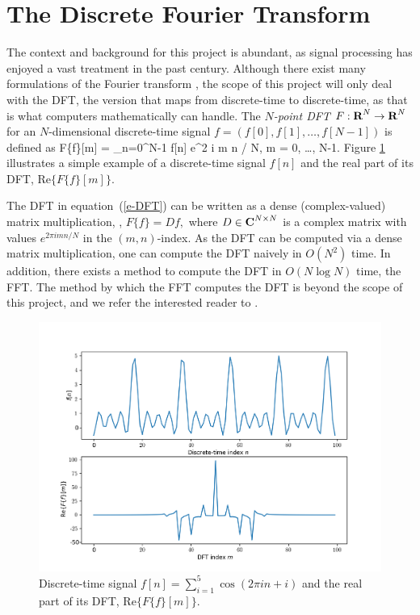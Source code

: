 \documentclass[12pt]{article}
\begin{document}
\section{The Discrete Fourier Transform}
The context and background for this project is abundant, as signal processing has enjoyed a vast treatment
in the past century. Although there exist many formulations of the Fourier transform \cite{O:17}, the scope 
of this project will only deal with the DFT, the version that maps from discrete-time to discrete-time, as 
that is what computers mathematically can handle. The \emph{$N$-point DFT} $F: {\mbox{\bf R}}^N \rightarrow {\mbox{\bf R}}^N$ for an 
$N$-dimensional discrete-time signal \cite{B:78,O:17} $f = (f[0], f[1], \ldots, f[N-1])$ is defined as
\BEQ \label{e-DFT}
F\{f\}[m] = \sum_{n=0}^{N-1} f[n] e^{2 \pi i m n / N}, \quad m = 0, \ldots, N-1.
\EEQ
Figure \ref{f-example_DFT} illustrates a simple example of a discrete-time 
signal $f[n]$ and the real part of its DFT, Re$\{F\{f\}[m]\}$.

The DFT in equation~(\ref{e-DFT}) can be written as a dense (complex-valued) matrix multiplication, \ie,
$F\{f\} = D f,$ where $D \in {\mbox{\bf C}}^{N \times N}$ is a complex matrix with values $e^{2 \pi i m n / N}$ in 
the $(m,n)$-index. As the DFT can be computed via a dense matrix multiplication, one can compute the DFT naively
in $O(N^2)$ time. In addition, there exists a method to compute the DFT in $O(N \log N)$ time, the FFT. The method 
by which the FFT computes the DFT is beyond the scope of this project, and we refer the interested reader to 
\cite{CT:65}.

\begin{figure}
\centering
\includegraphics[scale=.6]{figures/DFT_example.png}
\caption{Discrete-time signal $f[n] = \sum_{i=1}^5 \cos(2 \pi i n + i)$ and 
the real part of its DFT, Re$\{F\{f\}[m]\}$.}
\label{f-example_DFT}
\end{figure}
\end{document}
